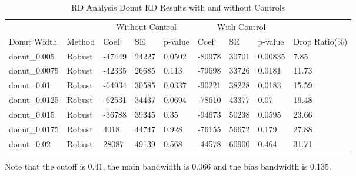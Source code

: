 \begin{table}[ht]
\centering
\begin{tabular}{lllllllll}
  \hline
 &  & \multicolumn{3}{c}{Without Control} & \multicolumn{3}{c}{With Control} & \\
Donut Width & Method & Coef & SE & p-value & Coef & SE & p-value & Drop Ratio(\%) \\ 
  \hline
donut\_0.005 & Robust & -47449 & 24227 & 0.0502 & -80978 & 30701 & 0.00835 & 7.85 \\ 
  donut\_0.0075 & Robust & -42335 & 26685 & 0.113 & -79698 & 33726 & 0.0181 & 11.73 \\ 
  donut\_0.01 & Robust & -64934 & 30585 & 0.0337 & -90221 & 38228 & 0.0183 & 15.59 \\ 
  donut\_0.0125 & Robust & -62531 & 34437 & 0.0694 & -78610 & 43377 & 0.07 & 19.48 \\ 
  donut\_0.015 & Robust & -36788 & 39345 & 0.35 & -94673 & 50238 & 0.0595 & 23.66 \\ 
  donut\_0.0175 & Robust & 4018 & 44747 & 0.928 & -76155 & 56672 & 0.179 & 27.88 \\ 
  donut\_0.02 & Robust & 28087 & 49139 & 0.568 & -44578 & 60900 & 0.464 & 31.71 \\ 
   \hline
\end{tabular}
Note that the cutoff is 0.41, the main bandwidth is 0.066 and the bias bandwidth is 0.135.
\caption{RD Analysis Donut RD Results with and without Controls} 
\label{tab:rd_robust_results}
\end{table}

